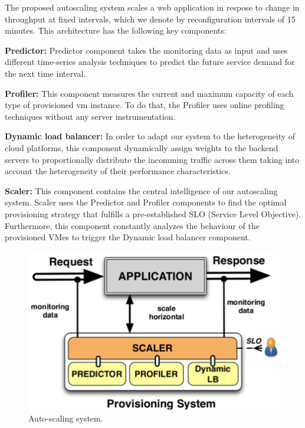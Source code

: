 

The proposed autoscaling system scales a web application in respose to change in throughput at fixed intervals, which we denote by reconfiguration intervals of 15 minutes. This architecture has the following key components:

\noindent\textbf{Predictor: } Predictor component takes the monitoring data as input and uses different time-series analysis techniques to predict the future service demand for the next time interval. 

\noindent\textbf{Profiler: } This component measures the current and maximum capacity of each type of provisioned vm instance. To do that, the Profiler uses online profiling techniques without any server instrumentation.

\noindent\textbf{Dynamic load balancer: } In order to adapt our system to the heterogeneity of cloud platforms, this component dynamically assign weights to the backend servers to proportionally distribute the incomming traffic across them taking into account the heterogeneity of their performance characteristics.


\noindent\textbf{Scaler: }  This component contains the central intelligence of our autoscaling system. Scaler uses the Predictor and Profiler components to find the optimal provisioning strategy that fulfills a pre-established SLO (Service Level Objective). Furthermore, this component constantly analyzes the behaviour of the provisioned VMes to trigger the Dynamic load balancer component.

\begin{figure}[htb]
  \begin{center}
    \includegraphics[width=.85\linewidth]{images/monitoringSchema}
  \end{center}
\vspace{-5mm}
  \caption{Auto-scaling system.}
  \label{autoScalingSys}
\end{figure}

